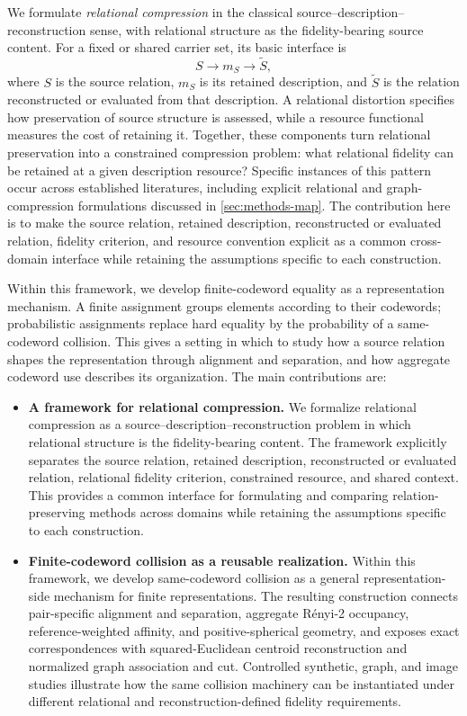 We formulate \emph{relational compression} in the classical source--description--reconstruction sense, with relational structure as the fidelity-bearing source content.
For a fixed or shared carrier set, its basic interface is
\begin{equation}
S\longrightarrow m_S\longrightarrow\widetilde S,
\label{eq:relational-interface-intro}
\end{equation}
where $S$ is the source relation, $m_S$ is its retained description, and $\widetilde S$ is the relation reconstructed or evaluated from that description.
A relational distortion specifies how preservation of source structure is assessed, while a resource functional measures the cost of retaining it.
Together, these components turn relational preservation into a constrained compression problem: what relational fidelity can be retained at a given description resource?
Specific instances of this pattern occur across established literatures, including explicit relational and graph-compression formulations discussed in \cref{sec:methods-map}.
The contribution here is to make the source relation, retained description, reconstructed or evaluated relation, fidelity criterion, and resource convention explicit as a common cross-domain interface while retaining the assumptions specific to each construction.

Within this framework, we develop finite-codeword equality as a representation mechanism.
A finite assignment groups elements according to their codewords; probabilistic assignments replace hard equality by the probability of a same-codeword collision.
This gives a setting in which to study how a source relation shapes the representation through alignment and separation, and how aggregate codeword use describes its organization.
The main contributions are:
\begin{itemize}
    \item \textbf{A framework for relational compression.}
    We formalize relational compression as a source--description--reconstruction problem in which relational structure is the fidelity-bearing content.
    The framework explicitly separates the source relation, retained description, reconstructed or evaluated relation, relational fidelity criterion, constrained resource, and shared context.
    This provides a common interface for formulating and comparing relation-preserving methods across domains while retaining the assumptions specific to each construction.

    \item \textbf{Finite-codeword collision as a reusable realization.}
    Within this framework, we develop same-codeword collision as a general representation-side mechanism for finite representations.
    The resulting construction connects pair-specific alignment and separation, aggregate R\'enyi-2 occupancy, reference-weighted affinity, and positive-spherical geometry, and exposes exact correspondences with squared-Euclidean centroid reconstruction and normalized graph association and cut.
    Controlled synthetic, graph, and image studies illustrate how the same collision machinery can be instantiated under different relational and reconstruction-defined fidelity requirements.
\end{itemize}

